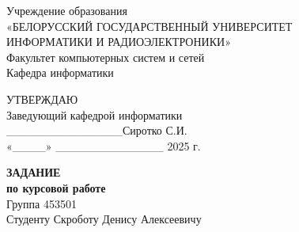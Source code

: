 \documentclass[12pt,a4paper]{extarticle}
\begin{document}
\newpage

\thispagestyle{empty}

\raggedright

\begin{center}
    Учреждение образования \\
    «БЕЛОРУССКИЙ ГОСУДАРСТВЕННЫЙ УНИВЕРСИТЕТ \\ ИНФОРМАТИКИ И РАДИОЭЛЕКТРОНИКИ» \\
    Факультет компьютерных систем и сетей \\
    Кафедра информатики \\
\end{center}

\hfill\begin{varwidth}{\textwidth}
    УТВЕРЖДАЮ \\
    Заведующий кафедрой информатики \\
    \_\_\_\_\_\_\_\_\_\_\_\_\_\_Сиротко С.И. \\
    «\_\_\_\_» \_\_\_\_\_\_\_\_\_\_\_\_\_ 2025 г.\\
\end{varwidth}

\begin{center}
    \textbf{
        ЗАДАНИЕ \\
        по курсовой работе \\
    }
    \hfill Группа 453501 \\
    Студенту Скроботу Денису Алексеевичу
\end{center}
\end{document}
